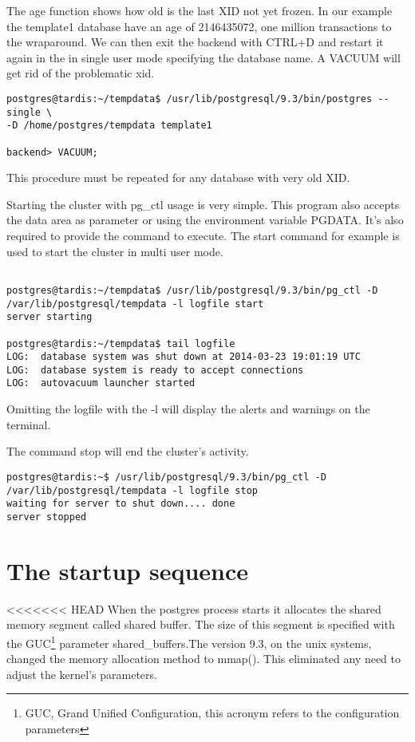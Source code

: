 The age function shows how old is the last XID not yet frozen. In our example the template1
database have an age of 2146435072, one million transactions to the wraparound. We can then exit 
the backend with CTRL+D and restart it again in the in single user mode specifying the database 
name. A VACUUM will get rid of the problematic xid.

\begin{verbatim}
postgres@tardis:~/tempdata$ /usr/lib/postgresql/9.3/bin/postgres --single \
-D /home/postgres/tempdata template1

backend> VACUUM;
\end{verbatim}

This procedure must be repeated for any database with very old XID.\newline

Starting the cluster with pg\_ctl usage is very simple. This program also accepts the data area as 
parameter or using the environment variable PGDATA. It's also required to provide the command to 
execute. The start command for example is used to start the cluster in multi user mode.

\begin{verbatim}

postgres@tardis:~/tempdata$ /usr/lib/postgresql/9.3/bin/pg_ctl -D 
/var/lib/postgresql/tempdata -l logfile start
server starting

postgres@tardis:~/tempdata$ tail logfile 
LOG:  database system was shut down at 2014-03-23 19:01:19 UTC
LOG:  database system is ready to accept connections
LOG:  autovacuum launcher started

\end{verbatim}
Omitting the logfile with the -l will display the alerts and warnings on the terminal.

The command stop will end the cluster's activity.

\begin{verbatim}
postgres@tardis:~$ /usr/lib/postgresql/9.3/bin/pg_ctl -D 
/var/lib/postgresql/tempdata -l logfile stop
waiting for server to shut down.... done
server stopped
\end{verbatim}

\section{The startup sequence}
\label{sec:STARTUP}

<<<<<<< HEAD
When the postgres process starts it allocates the shared memory segment called shared buffer. The
size of this segment is specified with the GUC\footnote{GUC, Grand Unified Configuration, this 
acronym refers to the configuration parameters} parameter shared\_buffers.The
version 9.3, on the
unix systems, changed the memory allocation method to mmap(). This eliminated any need to adjust
the kernel's parameters.

